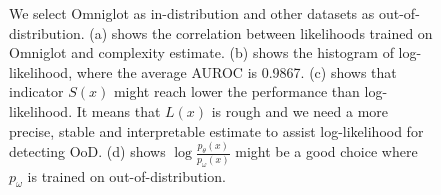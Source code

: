 \documentclass[letterpaper]{article} %
\begin{document}
\begin{figure}[t]
\centering
{}
\caption{We select Omniglot as in-distribution and other datasets as out-of-distribution. (a) shows the correlation between likelihoods trained on Omniglot and complexity estimate. (b) shows the histogram of log-likelihood, where the average AUROC is 0.9867. (c) shows that indicator $S(x)$ might reach lower the performance than log-likelihood. It means that $L(x)$ is rough and we need a more precise, stable and interpretable estimate to assist log-likelihood for detecting OoD. (d) shows $\log \frac{p_\theta(x)}{p_\omega(x)}$ might be a good choice where $p_\omega$ is trained on out-of-distribution.%
}
\label{fig2}
\end{figure}
\end{document}
